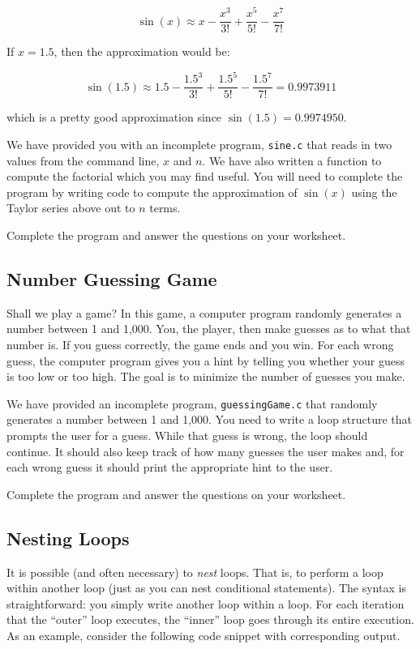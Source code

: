 \documentclass[12pt]{scrartcl}
\begin{document}
$$\sin{(x)} \approx x - \frac{x^3}{3!}+\frac{x^5}{5!}- \frac{x^7}{7!}$$

If $x = 1.5$, then the approximation would be:

$$\sin{(1.5)} \approx 1.5 - \frac{1.5^3}{3!}+\frac{1.5^5}{5!}- \frac{1.5^7}{7!} = 0.9973911$$

which is a pretty good approximation since $\sin{(1.5)} = 0.9974950$.

We have provided you with an incomplete program, \texttt{sine.c} 
that reads in two values from the command line, $x$ and $n$.  We have also 
written a function to compute the factorial which you may find useful.  
You will need to complete the program by writing code to compute 
the approximation of $\sin(x)$ using the Taylor series above out to $n$ 
terms.

Complete the program and answer the questions on your worksheet. 

\subsection{Number Guessing Game}

Shall we play a game?  In this game, a computer program randomly 
generates a number between 1 and 1,000.  You, the player, then 
make guesses as to what that number is.  If you guess correctly, 
the game ends and you win.  For each wrong guess, the computer 
program gives you a hint by telling you whether your guess is too 
low or too high.  The goal is to minimize the number of guesses 
you make.

We have provided an incomplete program, \texttt{guessingGame.c} 
that randomly generates a number between 1 and 1,000.  You 
need to write a loop structure that prompts the user for a guess.  
While that guess is wrong, the loop should continue.  It should 
also keep track of how many guesses the user makes and, for 
each wrong guess it should print the appropriate hint to the user.

Complete the program and answer the questions on your worksheet. 

\subsection{Nesting Loops}

It is possible (and often necessary) to \emph{nest} loops.  That is, to 
perform a loop within another loop (just as you can nest conditional 
statements).  The syntax is straightforward: you simply write another 
loop within a loop.  For each iteration that the ``outer'' loop executes, 
the ``inner'' loop goes through its entire execution.  As an example, 
consider the following code snippet with corresponding output.
\end{document}
